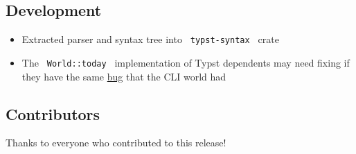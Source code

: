 \subsection{Development}\label{development}

\begin{itemize}
\tightlist
\item
  Extracted parser and syntax tree into \texttt{\ typst-syntax\ } crate
\item
  The \texttt{\ World::today\ } implementation of Typst dependents may
  need fixing if they have the same
  \href{https://github.com/typst/typst/issues/1842}{bug} that the CLI
  world had
\end{itemize}

\subsection{Contributors}\label{contributors}

Thanks to everyone who contributed to this release!

